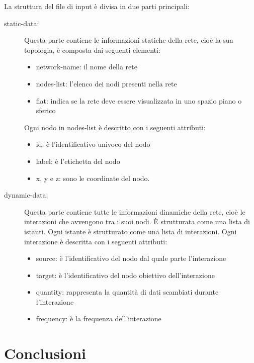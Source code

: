 \documentclass[a4paper,12pt]{article}
\begin{document}
La struttura del file di input \`e divisa in due parti principali:
\begin{description}
 \item[static-data:] Questa parte contiene le informazioni statiche della rete, cio\`e la sua topologia, \`e composta dai seguenti elementi:
 \begin{itemize}
  \item network-name: il nome della rete
  \item nodes-list: l'elenco dei nodi presenti nella rete
  \item flat: indica se la rete deve essere visualizzata in uno spazio piano o sferico
 \end{itemize}
Ogni nodo in nodes-list \`e descritto con i seguenti attributi:
 \begin{itemize}
  \item id: \`e l'identificativo univoco del nodo
  \item label: \`e l'etichetta del nodo
  \item x, y e z: sono le coordinate del nodo.
 \end{itemize}
 \item[dynamic-data:] Questa parte contiene tutte le informazioni dinamiche della rete, cio\`e le interazioni che avvengono tra i suoi nodi. \`E strutturata come una lista di istanti. Ogni istante \`e strutturato come una lista di interazioni. Ogni interazione \`e descritta con i seguenti attributi:
 \begin{itemize}
  \item source: \`e l'identificativo del nodo dal quale parte l'interazione
  \item target: \`e l'identificativo del nodo obiettivo dell'interazione
  \item quantity: rappresenta la quantità di dati scambiati durante l'interazione
  \item frequency: \`e la frequenza dell'interazione
 \end{itemize}
\end{description}

\section{Conclusioni }
 
\end{document}
